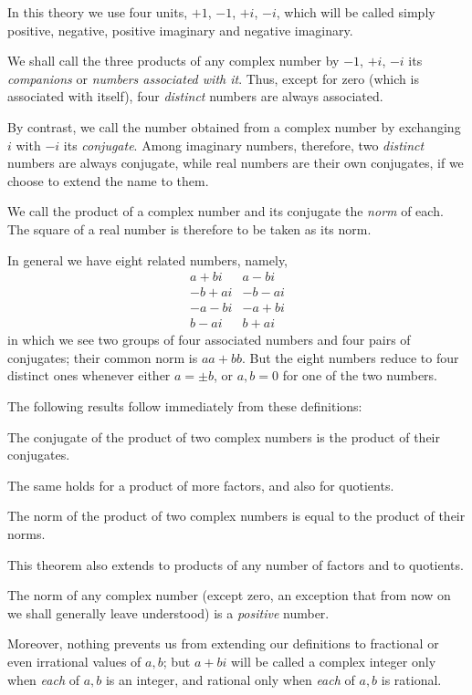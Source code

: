 %
In this theory we use four units, $+1$, $-1$, $+i$, $-i$, which will be called simply positive, negative, positive imaginary and negative imaginary.

We shall call the three products of any complex number by $-1$, $+i$, $-i$ its \emph{companions} or \emph{numbers associated with it}. Thus, except for zero (which is associated with itself), four \emph{distinct} numbers are always associated.

By contrast, we call the number obtained from a complex number by exchanging $i$ with $-i$ its \emph{conjugate}. Among imaginary numbers, therefore, two \emph{distinct} numbers are always conjugate, while real numbers are their own conjugates, if we choose to extend the name to them.

We call the product of a complex number and its conjugate the \emph{norm} of each. The square of a real number is therefore to be taken as its norm.

In general we have eight related numbers, namely,
\[
\begin{array}{r|r}
a+bi&a-bi\\
-b+ai&-b-ai\\
-a-bi&-a+bi\\
b-ai&b+ai
\end{array}
\]
in which we see two groups of four associated numbers and four pairs of conjugates; their common norm is $aa+bb$. But the eight numbers reduce to four distinct ones whenever either $a=\pm b$, or $a,b=0$ for one of the two numbers.

The following results follow immediately from these definitions:

The conjugate of the product of two complex numbers is the product of their conjugates.

The same holds for a product of more factors, and also for quotients.

The norm of the product of two complex numbers is equal to the product of their norms.

This theorem also extends to products of any number of factors and to quotients.

The norm of any complex number (except zero, an exception that from now on we shall generally leave understood) is a \emph{positive} number.

Moreover, nothing prevents us from extending our definitions to fractional or even irrational values of $a,b$; but $a+bi$ will be called a complex integer only when \emph{each} of $a,b$ is an integer, and rational only when \emph{each} of $a,b$ is rational.

